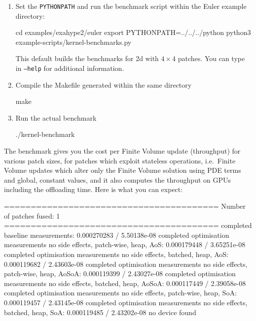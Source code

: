 \begin{framed}
\begin{enumerate}
  \begin{bash}
make
  \end{bash}
  \item Set the \texttt{PYTHONPATH} and run the benchmark script within the
  Euler example directory:
  \begin{bash}
  cd examples/exahype2/euler
  export PYTHONPATH=../../../python
  python3 example-scripts/kernel-benchmarks.py
  \end{bash}
  This default builds the benchmarks for 2d with $4 \times 4$ patches. You can
  type in \texttt{--help} for additional information.
  \item Compile the Makefile generated within the same directory
  \begin{bash}
make
  \end{bash}
  \item Run the actual benchmark
  \begin{bash}
./kernel-benchmark
  \end{bash}
\end{enumerate}

\noindent
The benchmark gives you the cost per Finite Volume update (throughput) for
various patch sizes, for patches which exploit stateless operations, i.e.~Finite
Volume updates which alter only the Finite Volume solution using PDE terms and
global, constant values, and it also computes the throughput on GPUs including
the offloading time.
Here is what you can expect:

\begin{terminalOutput}
========================================
  Number of patches fused: 1
========================================
completed baseline measurements: 0.000270283 / 5.50138e-08
completed optimisation measurements no side effects, patch-wise, heap, AoS: 0.000179448 / 3.65251e-08
completed optimisation measurements no side effects, batched, heap, AoS: 0.000119682 / 2.43603e-08
completed optimisation measurements no side effects, patch-wise, heap, AoSoA: 0.000119399 / 2.43027e-08
completed optimisation measurements no side effects, batched, heap, AoSoA: 0.000117449 / 2.39058e-08
completed optimisation measurements no side effects, patch-wise, heap, SoA: 0.000119457 / 2.43145e-08
completed optimisation measurements no side effects, batched, heap, SoA: 0.000119485 / 2.43202e-08
no device found
\end{terminalOutput}


\end{framed}
